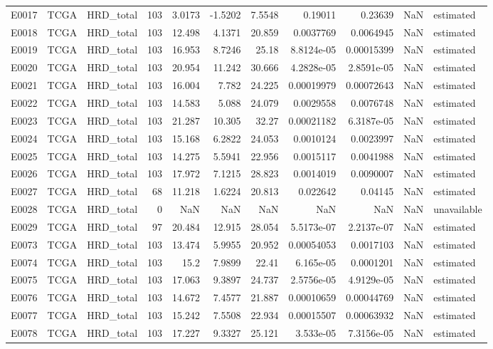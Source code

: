 \begin{longtable}{lllrrrrrrrl}
E0017 & TCGA & HRD\_total & 103 & 3.0173 & -1.5202 & 7.5548 & 0.19011 & 0.23639 & NaN & estimated \\
E0018 & TCGA & HRD\_total & 103 & 12.498 & 4.1371 & 20.859 & 0.0037769 & 0.0064945 & NaN & estimated \\
E0019 & TCGA & HRD\_total & 103 & 16.953 & 8.7246 & 25.18 & 8.8124e-05 & 0.00015399 & NaN & estimated \\
E0020 & TCGA & HRD\_total & 103 & 20.954 & 11.242 & 30.666 & 4.2828e-05 & 2.8591e-05 & NaN & estimated \\
E0021 & TCGA & HRD\_total & 103 & 16.004 & 7.782 & 24.225 & 0.00019979 & 0.00072643 & NaN & estimated \\
E0022 & TCGA & HRD\_total & 103 & 14.583 & 5.088 & 24.079 & 0.0029558 & 0.0076748 & NaN & estimated \\
E0023 & TCGA & HRD\_total & 103 & 21.287 & 10.305 & 32.27 & 0.00021182 & 6.3187e-05 & NaN & estimated \\
E0024 & TCGA & HRD\_total & 103 & 15.168 & 6.2822 & 24.053 & 0.0010124 & 0.0023997 & NaN & estimated \\
E0025 & TCGA & HRD\_total & 103 & 14.275 & 5.5941 & 22.956 & 0.0015117 & 0.0041988 & NaN & estimated \\
E0026 & TCGA & HRD\_total & 103 & 17.972 & 7.1215 & 28.823 & 0.0014019 & 0.0090007 & NaN & estimated \\
E0027 & TCGA & HRD\_total & 68 & 11.218 & 1.6224 & 20.813 & 0.022642 & 0.04145 & NaN & estimated \\
E0028 & TCGA & HRD\_total & 0 & NaN & NaN & NaN & NaN & NaN & NaN & unavailable \\
E0029 & TCGA & HRD\_total & 97 & 20.484 & 12.915 & 28.054 & 5.5173e-07 & 2.2137e-07 & NaN & estimated \\
E0073 & TCGA & HRD\_total & 103 & 13.474 & 5.9955 & 20.952 & 0.00054053 & 0.0017103 & NaN & estimated \\
E0074 & TCGA & HRD\_total & 103 & 15.2 & 7.9899 & 22.41 & 6.165e-05 & 0.0001201 & NaN & estimated \\
E0075 & TCGA & HRD\_total & 103 & 17.063 & 9.3897 & 24.737 & 2.5756e-05 & 4.9129e-05 & NaN & estimated \\
E0076 & TCGA & HRD\_total & 103 & 14.672 & 7.4577 & 21.887 & 0.00010659 & 0.00044769 & NaN & estimated \\
E0077 & TCGA & HRD\_total & 103 & 15.242 & 7.5508 & 22.934 & 0.00015507 & 0.00063932 & NaN & estimated \\
E0078 & TCGA & HRD\_total & 103 & 17.227 & 9.3327 & 25.121 & 3.533e-05 & 7.3156e-05 & NaN & estimated \\

\end{longtable}
